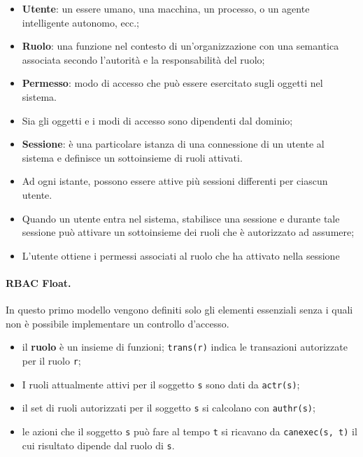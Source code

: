 \begin{itemize}
      \item \textbf{Utente}: un essere umano, una macchina, un processo, o un
            agente intelligente autonomo, ecc.;
      \item \textbf{Ruolo}: una funzione nel contesto di un'organizzazione con
            una semantica associata
            secondo l'autorità e la responsabilità del ruolo;
      \item \textbf{Permesso}: modo di accesso che può essere esercitato sugli
            oggetti nel sistema.
      \item Sia gli oggetti e i modi di accesso sono dipendenti dal dominio;
      \item \textbf{Sessione}: è una particolare istanza di una connessione di
            un utente al sistema e definisce
            un sottoinsieme di ruoli attivati.
      \item Ad ogni istante, possono essere attive più sessioni differenti per
            ciascun utente.
      \item Quando un utente entra nel sistema, stabilisce una sessione e durante
            tale sessione può
            attivare un sottoinsieme dei ruoli che è autorizzato ad assumere;
      \item L'utente ottiene i permessi associati al ruolo che ha attivato nella
            sessione
\end{itemize}

\paragraph{RBAC Float.}

In questo primo modello vengono definiti solo gli elementi essenziali senza i
quali non è possibile implementare un controllo d'accesso.

\begin{itemize}
      \item il \textbf{ruolo} è un insieme di funzioni; \verb|trans(r)|
            indica le transazioni autorizzate per il ruolo \verb|r|;
      \item I ruoli attualmente attivi per il soggetto \verb|s| sono dati da
            \verb|actr(s)|;
      \item il set di ruoli autorizzati per il soggetto \verb|s| si calcolano
            con \verb|authr(s)|;
      \item le azioni che il soggetto \verb|s| può fare al tempo \verb|t| si
            ricavano da \verb|canexec(s, t)| il cui risultato
            dipende dal ruolo di \verb|s|.
\end{itemize}

